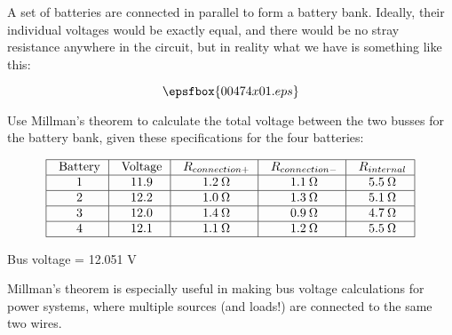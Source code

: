 

A set of batteries are connected in parallel to form a battery bank.  Ideally, their individual voltages would be exactly equal, and there would be no stray resistance anywhere in the circuit, but in reality what we have is something like this:

$$\epsfbox{00474x01.eps}$$

Use Millman's theorem to calculate the total voltage between the two busses for the battery bank, given these specifications for the four batteries:


$$\vbox{\offinterlineskip
\halign{\strut
\vrule \quad\hfil $#$ \ \hfil & 
\vrule \quad\hfil $#$ \ \hfil & 
\vrule \quad\hfil $#$ \ \hfil & 
\vrule \quad\hfil $#$ \ \hfil & 
\vrule \quad\hfil $#$ \ \hfil \vrule \cr
\noalign{\hrule}
%
\hbox{Battery} & \hbox{Voltage} & R_{connection +} & R_{connection -} & R_{internal}  \cr
\noalign{\hrule}
%
1 & 11.9 & 1.2 \> \Omega & 1.1 \> \Omega & 5.5 \> \Omega \cr
\noalign{\hrule}
%
2 & 12.2 & 1.0 \> \Omega & 1.3 \> \Omega & 5.1 \> \Omega \cr
\noalign{\hrule}
%
3 & 12.0 & 1.4 \> \Omega & 0.9 \> \Omega & 4.7 \> \Omega \cr
\noalign{\hrule}
%
4 & 12.1 & 1.1 \> \Omega & 1.2 \> \Omega & 5.5 \> \Omega \cr
\noalign{\hrule}
%
} %
}$$ %








Bus voltage = 12.051 V







Millman's theorem is especially useful in making bus voltage calculations for power systems, where multiple sources (and loads!) are connected to the same two wires.




